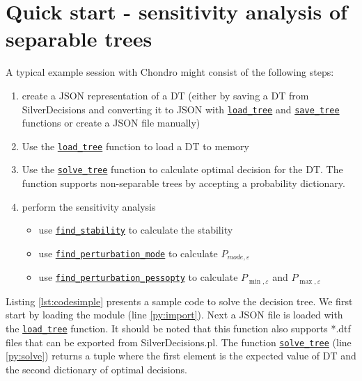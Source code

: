 \documentclass[a4paper,10pt,english]{sphinxmanual}
\begin{document}
	\section{Quick start - sensitivity analysis of separable trees}
	A typical example session with  Chondro might consist of the following steps:
	\begin{enumerate}
		\item create a JSON representation of a DT (either by saving a DT from SilverDecisions and converting it to JSON with \hyperref[index:chondro.load_tree]{\texttt{load\_tree}} and \hyperref[index:chondro.save_tree]{\texttt{save\_tree}} functions or create a JSON file manually)
		\item Use the \hyperref[index:chondro.load_tree]{\texttt{load\_tree}} function to load a DT to memory
		\item Use the \hyperref[index:chondro.solve_tree]{\texttt{solve\_tree}} function to calculate optimal decision for the DT. The function supports non-separable trees by accepting a probability dictionary.
		\item perform the sensitivity analysis
		\begin{itemize}
			\item use \hyperref[index:chondro.find_stability]{\texttt{find\_stability}} to calculate the stability 
			\item use \hyperref[index:chondro.find_perturbation_mode]{\texttt{find\_perturbation\_mode}} to calculate $P_{mode,\varepsilon}$
								
			\item use \hyperref[index:chondro.find_perturbation_pessopty]{
					\texttt{find\_perturbation\_pessopty}} to calculate $P_{\min,\varepsilon}$ and $P_{\max,\varepsilon}$
		\end{itemize}

	\end{enumerate}
	
	Listing \ref{lst:codesimple} presents a sample code to solve the decision tree. We first start by loading the module (line \ref{py:import}). Next a JSON file is loaded with the \hyperref[index:chondro.load_tree]{\texttt{load\_tree}}  function. It should be noted that this function also supports *.dtf files that can be exported from SilverDecisions.pl. The function \hyperref[index:chondro.solve_tree]{\texttt{solve\_tree}} (line \ref{py:solve}) returns a tuple where the first element is the expected value of DT and the second dictionary of optimal decisions. 
	
\end{document}
